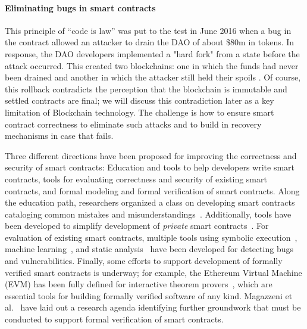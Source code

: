 \paragraph{Eliminating bugs in smart contracts}
This principle of ``code is law'' was put to the test in June 2016 when a bug in the contract allowed an attacker to drain the DAO of about \$80m in tokens. 
In response, the DAO developers implemented a "hard fork" from a state before the attack occurred. This created two blockchains: one in which the funds had never been drained and another in which the attacker still held their spoils \cite{Castillo16}. Of course, this rollback contradicts the perception that the blockchain is immutable and settled contracts are final; we will discuss this contradiction later as a key limitation of Blockchain technology. The challenge is how to ensure smart contract correctness to eliminate such attacks and to build in recovery mechanisms in case that fails.

Three different directions have been proposed for improving the correctness and security of smart contracts:  Education and tools to help developers write smart contracts, tools for evaluating correctness and security of existing smart contracts, and formal modeling and formal verification of smart contracts. Along the education path, researchers organized a class on developing smart contracts cataloging common mistakes and misunderstandings~\cite{FC:DAKMS16}. Additionally, tools have been developed to simplify development of \emph{private} smart contracts~\cite{SP:KMSWP16}. For evaluation of existing smart contracts, multiple tools using symbolic execution~\cite{CCS:LCOSH16}, machine learning~\cite{arxiv:Huang18}, and static analysis~\cite{CCS:BDFGGK+16,NDSS:KGDS18} have been developed for detecting bugs and vulnerabilities. Finally, some efforts to support development of formally verified smart contracts is underway; for example, the Ethereum Virtual Machine (EVM) has been fully defined for interactive theorem provers~\cite{Hirai17}, which are essential tools for building formally verified software of any kind. Magazzeni et al.~\cite{Magazzeni17} have laid out a research agenda identifying further groundwork that must be conducted to support formal verification of smart contracts.


